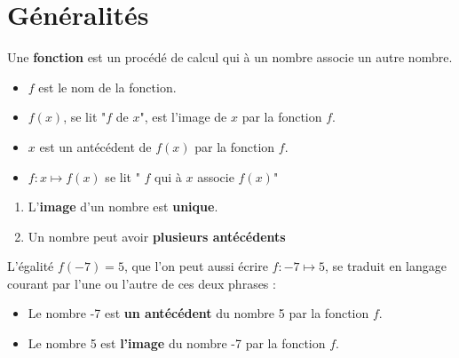 \section{Généralités}
\begin{definition}
    Une \textbf{fonction} est un procédé de calcul qui à un nombre associe un autre nombre.
\end{definition}

\begin{vocabulaireNotations}        
        \begin{itemize}
            \item $f$ est le nom de la fonction.
            \item $f(x)$, se lit "$f$ de $x$", est l'image de $x$ par la fonction $f$.
            \item $x$ est un antécédent de $f(x)$ par la fonction $f$.
            \item  $f : x\longmapsto f(x)$ se lit " $f$ qui à $x$ associe $f(x)$"
        \end{itemize}
\end{vocabulaireNotations}

\begin{remarques}
    \begin{enumerate}
        \item L'\textbf{image} d'un nombre est \textbf{unique}.
        \item Un nombre peut avoir \textbf{plusieurs antécédents}
    \end{enumerate}
\end{remarques}

\begin{exemple*1}
    L'égalité $f(-7)=5$, que l'on peut aussi écrire $f : -7\longmapsto 5$, se traduit en langage courant par l'une ou l'autre de ces deux phrases :
    \begin{itemize}
        \item Le nombre -7 est \textbf{un antécédent} du nombre 5 par la fonction $f$.
        \item Le nombre 5 est \textbf{l'image} du nombre -7 par la fonction $f$.
    \end{itemize}
\end{exemple*1}

